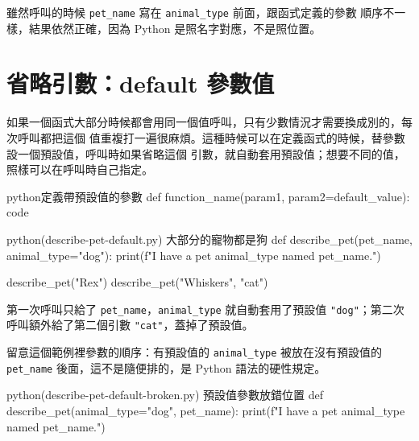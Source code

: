 
雖然呼叫的時候 \texttt{pet\_name} 寫在 \texttt{animal\_type} 前面，跟函式定義的參數
順序不一樣，結果依然正確，因為 Python 是照名字對應，不是照位置。


\section{省略引數：default 參數值}
\label{sec:function-params}

如果一個函式大部分時候都會用同一個值呼叫，只有少數情況才需要換成別的，每次呼叫都把這個
值重複打一遍很麻煩。這種時候可以在定義函式的時候，替參數設一個預設值，呼叫時如果省略這個
引數，就自動套用預設值；想要不同的值，照樣可以在呼叫時自己指定。

\begin{code}{python}{定義帶預設值的參數}
def function_name(param1, param2=default_value):
    code
\end{code}

\begin{example}{python}{(describe-pet-default.py) 大部分的寵物都是狗}
def describe_pet(pet_name, animal_type="dog"):
    print(f"I have a pet {animal_type} named {pet_name}.")


describe_pet("Rex")
describe_pet("Whiskers", "cat")
\end{example}


第一次呼叫只給了 \texttt{pet\_name}，\texttt{animal\_type} 就自動套用了預設值
\texttt{"dog"}；第二次呼叫額外給了第二個引數 \texttt{"cat"}，蓋掉了預設值。

留意這個範例裡參數的順序：有預設值的 \texttt{animal\_type} 被放在沒有預設值的
\texttt{pet\_name} 後面，這不是隨便排的，是 Python 語法的硬性規定。

\begin{example}{python}{(describe-pet-default-broken.py) 預設值參數放錯位置}
def describe_pet(animal_type="dog", pet_name):
    print(f"I have a pet {animal_type} named {pet_name}.")
\end{example}

